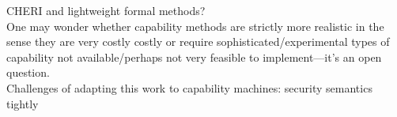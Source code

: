 {%
CHERI and lightweight formal methods?
%
\\
%
One may wonder whether capability methods are strictly more realistic in the sense they are very costly
costly or require sophisticated/experimental types of capability not
available/perhaps not very feasible to implement---it's an open question.
%
\\
%
Challenges of adapting this work to capability machines: security semantics tightly
}
